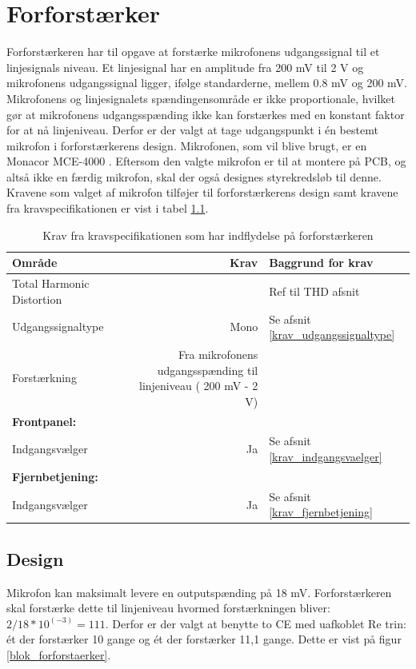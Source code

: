 \chapter{Forforstærker}

Forforstærkeren har til opgave at forstærke mikrofonens udgangssignal til et linjesignals niveau. Et linjesignal har en amplitude fra 200 mV til 2 V og mikrofonens udgangssignal ligger, ifølge standarderne, mellem 0.8 mV og 200 mV. Mikrofonens og linjesignalets spændingensområde er ikke proportionale, hvilket gør at mikrofonens udgangsspænding ikke kan forstærkes med en konstant faktor for at nå linjeniveau. Derfor er der valgt at tage udgangspunkt i én bestemt mikrofon i forforstærkerens design.
Mikrofonen, som vil blive brugt, er en Monacor MCE-4000 . Eftersom den valgte mikrofon er til at montere på PCB, og altså ikke en færdig mikrofon, skal der også designes styrekredsløb til denne. Kravene som valget af mikrofon tilføjer til forforstærkerens design samt kravene fra kravspecifikationen er vist i tabel \ref{tab:krav_forforstaerker}. 

\begin{table}[h]
\centering
\begin{tabular}{l|r|l}
\hline\hline
Område & Krav & Baggrund for krav \\
\hline\hline
Total Harmonic Distortion & \color{red}{<1 \%} & Ref til THD afsnit \\
Udgangssignaltype & Mono & Se afsnit \ref{krav_udgangssignaltype} \\
Forstærkning & Fra mikrofonens udgangsspænding til linjeniveau ( 200 mV - 2 V) & \\
\textbf{Frontpanel:} & & \\
Indgangsvælger & Ja & Se afsnit \ref{krav_indgangsvaelger} \\
\textbf{Fjernbetjening:} & & \\
Indgangsvælger & Ja &  Se afsnit \ref{krav_fjernbetjening}\\
\hline\hline
\end{tabular}
\caption{Krav fra kravspecifikationen som har indflydelse på forforstærkeren}
\label{tab:krav_forforstaerker}
\end{table}



\section{Design}


Mikrofon kan maksimalt levere en outputspænding på 18 mV. Forforstærkeren skal forstærke dette til linjeniveau hvormed forstærkningen bliver: $2/18*10^(-3)=111$. Derfor er der valgt at benytte to CE med uafkoblet Re trin: ét der forstærker 10 gange og ét der forstærker 11,1 gange. Dette er vist på figur \ref{blok_forforstaerker}.

